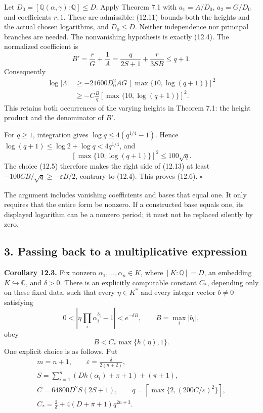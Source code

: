 \documentclass[
  11pt,
  a4paper,
]{article}
\begin{document}
Let \(D_0=[\mathbb Q(\alpha,\gamma):\mathbb Q]\le D\). Apply Theorem 7.1
with \(a_1=A/D_0\), \(a_2=G/D_0\) and coefficients \(r,1\). These are
admissible: (12.11) bounds both the heights and the actual chosen
logarithms, and \(D_0\le D\). Neither independence nor principal
branches are needed. The nonvanishing hypothesis is exactly (12.4). The
normalized coefficient is \[
B'=\frac rG+\frac1A
   =\frac q{2S+1}+\frac r{3SB}\le q+1.
\tag{12.12}
\] Consequently \[
\begin{aligned}
\log|\Lambda|
&\ge-21600D_0^2AG\,[\max\{10,\log(q+1)\}]^2\\
&\ge-C\frac Bq[\max\{10,\log(q+1)\}]^2.
\end{aligned}
\tag{12.13}
\] This retains both occurrences of the varying heights in Theorem 7.1:
the height product and the denominator of \(B'\).

For \(q\ge1\), integration gives \(\log q\le4(q^{1/4}-1)\). Hence
\(\log(q+1)\le\log2+\log q<4q^{1/4}\), and \[
[\max\{10,\log(q+1)\}]^2\le100\sqrt q.
\] The choice (12.5) therefore makes the right side of (12.13) at least
\(-100CB/\sqrt q\ge-\varepsilon B/2\), contrary to (12.4). This proves
(12.6). \(\square\)

The argument includes vanishing coefficients and bases that equal one.
It only requires that the entire form be nonzero. If a constructed base
equals one, its displayed logarithm can be a nonzero period; it must not
be replaced silently by zero.

\subsection{3. Passing back to a multiplicative
expression}\label{passing-back-to-a-multiplicative-expression}

\textbf{Corollary 12.3.} Fix nonzero \(\alpha_1,\ldots,\alpha_n\in K\),
where \([K:\mathbb Q]=D\), an embedding \(K\hookrightarrow\mathbb C\),
and \(\delta>0\). There is an explicitly computable constant \(C_*\),
depending only on these fixed data, such that every \(\eta\in K^*\) and
every integer vector \(b\ne0\) satisfying \[
0<\left|\eta\prod_i\alpha_i^{b_i}-1\right|<e^{-\delta B},
\qquad B=\max_i|b_i|,
\tag{12.14}
\] obey \[
B<C_*\max\{h(\eta),1\}.
\tag{12.15}
\] One explicit choice is as follows. Put \[
\begin{gathered}
m=n+1,\qquad \varepsilon=\frac\delta{2(n+2)},\\
S=\sum_{i=1}^n(Dh(\alpha_i)+\pi+1)+(\pi+1),\\
C=64800D^2S(2S+1),\qquad
q=\left\lceil\max\{2,(200C/\varepsilon)^2\}\right\rceil,\\
C_*=\frac2\delta+4(D+\pi+1)q^{2n+3}.
\end{gathered}
\tag{12.16}
\]
\end{document}
